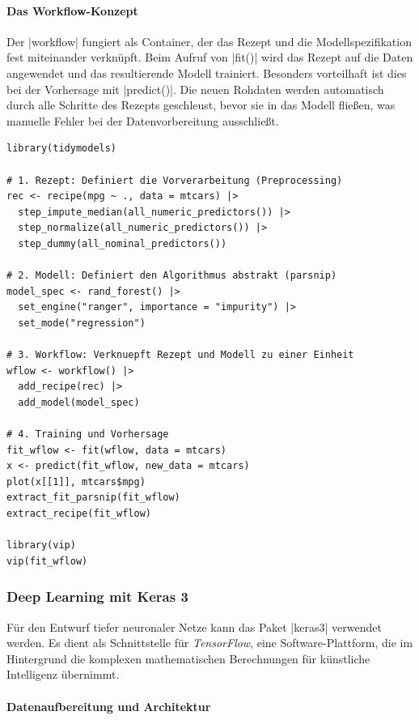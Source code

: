 \documentclass[10pt,twocolumn]{scrartcl}
\renewcommand{\lstinline}{\mycoloredinline}
\begin{document}
\paragraph{Das Workflow-Konzept}

Der \lstinline|workflow| fungiert als Container, der das Rezept und die Modellspezifikation fest miteinander verknüpft. Beim Aufruf von \lstinline|fit()| wird das Rezept auf die Daten angewendet und das resultierende Modell trainiert. Besonders vorteilhaft ist dies bei der Vorhersage mit \lstinline|predict()|. Die neuen Rohdaten werden automatisch durch alle Schritte des Rezepts geschleust, bevor sie in das Modell fließen, was manuelle Fehler bei der Datenvorbereitung ausschließt.

\begin{lstlisting}
library(tidymodels)

# 1. Rezept: Definiert die Vorverarbeitung (Preprocessing)
rec <- recipe(mpg ~ ., data = mtcars) |>
  step_impute_median(all_numeric_predictors()) |>
  step_normalize(all_numeric_predictors()) |>
  step_dummy(all_nominal_predictors()) 

# 2. Modell: Definiert den Algorithmus abstrakt (parsnip)
model_spec <- rand_forest() |>
  set_engine("ranger", importance = "impurity") |>
  set_mode("regression")

# 3. Workflow: Verknuepft Rezept und Modell zu einer Einheit
wflow <- workflow() |> 
  add_recipe(rec) |> 
  add_model(model_spec)

# 4. Training und Vorhersage
fit_wflow <- fit(wflow, data = mtcars)
x <- predict(fit_wflow, new_data = mtcars)
plot(x[[1]], mtcars$mpg)
extract_fit_parsnip(fit_wflow)
extract_recipe(fit_wflow)

library(vip)
vip(fit_wflow)
\end{lstlisting}


\subsubsection{Deep Learning mit Keras 3}

Für den Entwurf tiefer neuronaler Netze kann das Paket \lstinline|keras3| verwendet werden. Es dient als Schnittstelle für \emph{TensorFlow}, eine Software-Plattform, die im Hintergrund die komplexen mathematischen Berechnungen für künstliche Intelligenz übernimmt.

\paragraph{Datenaufbereitung und Architektur}
\end{document}
